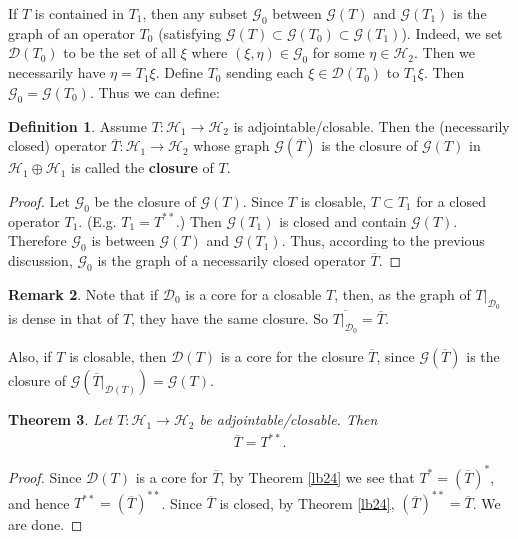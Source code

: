 \documentclass[12pt,b5paper,notitlepage]{article}
\theoremstyle{definition}
\newtheorem{df}{Definition}[section]
\newtheorem{rem}[df]{Remark}
\theoremstyle{plain}
\newtheorem{thm}[df]{Theorem}
\newcommand{\mc}{\mathcal}
\newcommand{\ovl}{\overline}
\newcommand{\Dom}{\scr D}
\newcommand{\scr}{\mathscr}
\numberwithin{equation}{section}
\begin{document}
If $T$ is contained in  $T_1$, then any subset $\scr G_0$  between $\scr G(T)$ and $\scr G(T_1)$ is the graph of an operator $T_0$ (satisfying $\scr G(T)\subset\scr G(T_0)\subset \scr G(T_1)$). Indeed, we set $\Dom(T_0)$ to be the set of all $\xi$ where $(\xi,\eta)\in\scr G_0$ for some $\eta\in\mc H_2$. Then we necessarily have $\eta=T_1\xi$. Define $T_0$ sending each $\xi\in\Dom(T_0)$ to $T_1\xi$. Then $\scr G_0=\scr G(T_0)$. Thus we can define:

\begin{df}
Assume $T:\mc H_1\rightarrow\mc H_2$ is adjointable/closable. Then the (necessarily closed) operator $\ovl T:\mc H_1\rightarrow\mc H_2$ \index{T@$\ovl T=T^{**}$} whose graph $\scr G(\ovl T)$ is the closure of $\scr G(T)$ in $\mc H_1\oplus \mc H_1$ is called the \textbf{closure} of $T$.
\end{df} 

\begin{proof}
Let $\scr G_0$ be the closure of $\scr G(T)$. Since $T$ is closable, $T\subset T_1$ for a closed operator $T_1$. (E.g. $T_1=T^{**}$.) Then $\scr G(T_1)$ is closed and contain $\scr G(T)$. Therefore $\scr G_0$ is between $\scr G(T)$ and $\scr G(T_1)$. Thus, according to the previous discussion, $\scr G_0$ is the graph of a necessarily closed operator $\ovl T$.
\end{proof}


\begin{rem}
Note that if $\scr D_0$ is a core for a closable $T$, then, as the graph of $T|_{\scr D_0}$ is dense in that of $T$, they have the same closure. So $\ovl{T|_{\scr D_0}}=\ovl T$. 

Also, if $T$ is closable, then $\Dom(T)$ is a core for the closure $\ovl T$, since $\scr G(\ovl T)$ is the closure of $\scr G(\ovl T|_{\Dom(T)})=\scr G(T)$.
\end{rem}


\begin{thm}
Let $T:\mc H_1\rightarrow\mc H_2$ be adjointable/closable. Then
\begin{align*}
\ovl T=T^{**}.	
\end{align*}
\end{thm}

\begin{proof}
Since $\Dom(T)$ is a core for $\ovl T$, by Theorem \ref{lb24} we see that $T^*=(\ovl T)^*$, and hence $T^{**}=(\ovl T)^{**}$. Since $\ovl T$ is closed, by Theorem \ref{lb24}, $(\ovl T)^{**}=\ovl T$. We are done. 
\end{proof}
\end{document}
